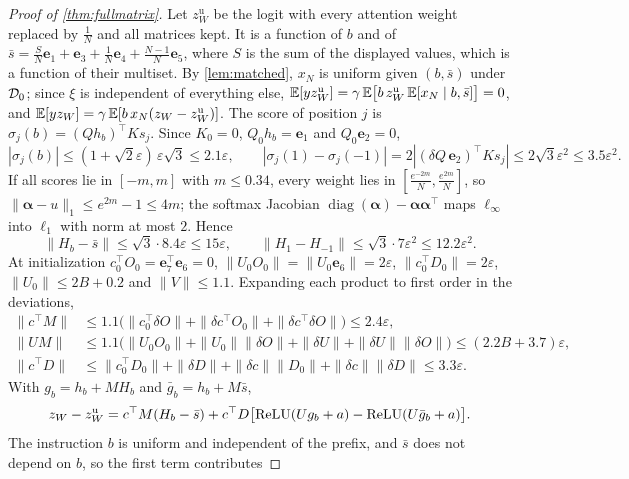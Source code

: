 \begin{proof}[Proof of \cref{thm:fullmatrix}]
Let $z^{\mathrm{u}}_W$ be the logit with every attention weight replaced by $\tfrac1N$ and all matrices kept.
It is a function of $b$ and of $\bar s=\tfrac{S}{N}\bm e_1+\bm e_3+\tfrac1N\bm e_4+\tfrac{N-1}{N}\bm e_5$, where $S$ is the sum of the displayed values,
which is a function of their multiset. By \cref{lem:matched}, $x_N$ is uniform given $(b,\bar s)$ under $\mathcal D_{0}$; since $\xi$ is independent of everything else,
$\mathbb E[yz^{\mathrm u}_W]=\gamma\,\mathbb E\bigl[b\,z^{\mathrm u}_W\,\mathbb E[x_N\mid b,\bar s]\bigr]=0$, and $\mathbb E[yz_W]=\gamma\,\mathbb E[b\,x_N(z_W-z^{\mathrm u}_W)]$.
The score of position $j$ is $\sigma_j(b)=(Qh_b)^\top Ks_j$. Since $K_0=0$, $Q_0h_b=\bm e_1$ and $Q_0\bm e_2=0$,
\[
 |\sigma_j(b)|\le(1+\sqrt2\varepsilon)\,\varepsilon\sqrt3\le2.1\varepsilon,\qquad
 |\sigma_j(1)-\sigma_j(-1)|=2|(\delta Q\,\bm e_2)^\top Ks_j|\le2\sqrt3\varepsilon^2\le3.5\varepsilon^2 .
\]
If all scores lie in $[-m,m]$ with $m\le0.34$, every weight lies in $[\tfrac{e^{-2m}}{N},\tfrac{e^{2m}}{N}]$, so $\|\bm\alpha-u\|_1\le e^{2m}-1\le4m$;
the softmax Jacobian $\operatorname{diag}(\bm\alpha)-\bm\alpha\bm\alpha^\top$ maps $\ell_\infty$ into $\ell_1$ with norm at most $2$. Hence
\[
 \|H_b-\bar s\|\le\sqrt3\cdot8.4\varepsilon\le15\varepsilon,\qquad
 \|H_1-H_{-1}\|\le\sqrt3\cdot7\varepsilon^2\le12.2\varepsilon^2 .
\]
At initialization $c_0^\top O_0=\bm e_7^\top\bm e_6=0$, $\|U_0O_0\|=\|U_0\bm e_6\|=2\varepsilon$, $\|c_0^\top D_0\|=2\varepsilon$, $\|U_0\|\le2B+0.2$ and $\|V\|\le1.1$.
Expanding each product to first order in the deviations,
\begin{align*}
 \|c^\top M\|&\le1.1\bigl(\|c_0^\top\delta O\|+\|\delta c^\top O_0\|+\|\delta c^\top\delta O\|\bigr)\le2.4\varepsilon,\\
 \|UM\|&\le1.1\bigl(\|U_0O_0\|+\|U_0\|\|\delta O\|+\|\delta U\|+\|\delta U\|\|\delta O\|\bigr)\le(2.2B+3.7)\varepsilon,\\
 \|c^\top D\|&\le\|c_0^\top D_0\|+\|\delta D\|+\|\delta c\|\|D_0\|+\|\delta c\|\|\delta D\|\le3.3\varepsilon .
\end{align*}
With $g_b=h_b+MH_b$ and $\bar g_b=h_b+M\bar s$,
\[
 z_W-z^{\mathrm u}_W=c^\top M(H_b-\bar s)+c^\top D\bigl[\operatorname{ReLU}(Ug_b+a)-\operatorname{ReLU}(U\bar g_b+a)\bigr].
\]
The instruction $b$ is uniform and independent of the prefix, and $\bar s$ does not depend on $b$, so the first term contributes

\end{proof}
